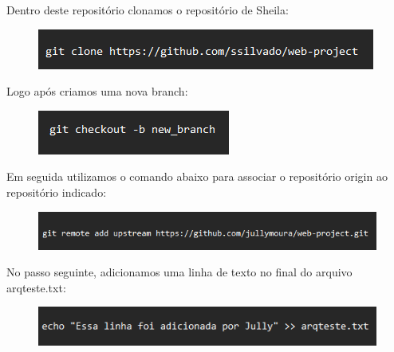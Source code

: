 \documentclass{article}
\begin{document}
    Dentro deste repositório clonamos o repositório de Sheila:

    \vspace{0.5cm}
    
    \begin{figure}[hb]
        \centering
        \includegraphics[width=0.9\linewidth]{clone.png}
        \label{fig:enter-label}
    \end{figure}

    \vspace{0.5cm}

    Logo após criamos uma nova branch: 

    \vspace{0.5cm}    

    \begin{figure}[!hb]
        \centering
        \includegraphics[width=0.5\linewidth]{check.png}
        \label{fig:enter-label}
    \end{figure}

    \vspace{9cm}

    Em seguida utilizamos o comando abaixo para associar o repositório origin ao repositório indicado:

    \vspace{0.5cm}

    \begin{figure}[hb]
        \centering
        \includegraphics[width=1.2\linewidth]{remote.png}
        \label{fig:enter-label}
    \end{figure}

    \vspace{0.5cm}

    No passo seguinte, adicionamos uma linha de texto no final do arquivo arqteste.txt:

    \vspace{0.5cm}

    \begin{figure}[hb]
        \centering
        \includegraphics[width=1\linewidth]{echo.png}
        \label{fig:enter-label}
    \end{figure}
\end{document}
